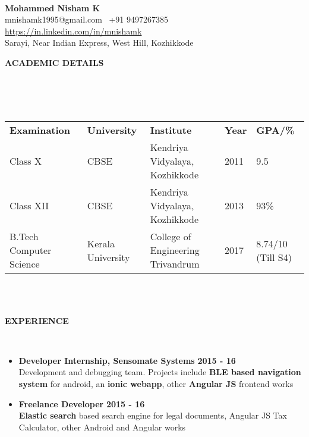 \documentclass[a4paper,10pt]{article}
\newcommand{\lsep}{-0.5cm}
\newcommand{\resheading}[1]{{\small \colorbox{mygrey}{\begin{minipage}{0.975\textwidth}{\textbf{\uppercase{#1} \vphantom{p\^{E}}}}\end{minipage}}}}
\newcommand{\when}[1]{\hfill \textbf{#1}}
\newenvironment{noSepItemize}
{ \begin{itemize}
    \setlength{\itemsep}{1pt}
    \setlength{\parskip}{0pt}
    \setlength{\parsep}{0pt}     }
{ \end{itemize}                  }
\begin{document}
\hspace{0.5cm}\\[-0.2cm]

\begin{center}
\textbf{\Large{Mohammed Nisham K}} \\
mnishamk1995@gmail.com \textbullet\, +91 9497267385 \textbullet\, \href{https://in.linkedin.com/in/mnishamk}{https://in.linkedin.com/in/mnishamk}\\
Sarayi, Near Indian Express, West Hill, Kozhikkode \\
\end{center}

\resheading{\textbf{ACADEMIC DETAILS} }\\[\lsep]
\\ \\
\indent \begin{tabular}{ l @{\hskip 0.15in} l @{\hskip 0.15in} l @{\hskip 0.15in} l @{\hskip 0.15in} l }
\textbf{Examination} & \textbf{University} & \textbf{Institute} & \textbf{Year} & \textbf{GPA/\%} \\
Class X & CBSE & Kendriya Vidyalaya, Kozhikkode & 2011 & 9.5 \\
Class XII & CBSE & Kendriya Vidyalaya, Kozhikkode & 2013 & 93\% \\
B.Tech Computer Science & Kerala University & College of Engineering Trivandrum & 2017 & 8.74/10 (Till S4)\\
\end{tabular}
\\ \\

\resheading{\textbf{Experience} }\\[\lsep]
\begin{noSepItemize}
\item \noindent \textbf{Developer Internship, Sensomate Systems} \when{2015 - 16}\\
	\indent Development and debugging team. Projects include \textbf{BLE based navigation system} for android, an \textbf{ionic webapp}, other \textbf{Angular JS} frontend works
\item \noindent \textbf{Freelance Developer} \when{2015 - 16}\\
	\indent \textbf{Elastic search} based search engine for legal documents, Angular JS Tax Calculator, other Android and Angular works
\end{noSepItemize}
\end{document}
